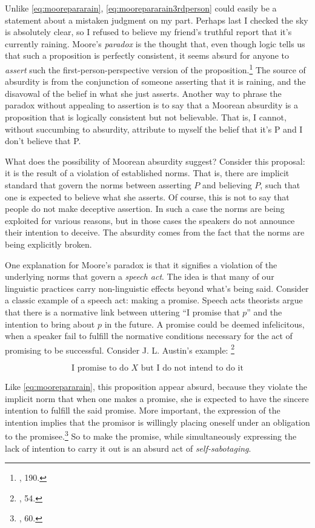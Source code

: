 Unlike \ref{eq:moorepararain}, \ref{eq:moorepararain3rdperson} could easily be a statement about a mistaken judgment on my
part. Perhaps last I checked the sky is absolutely clear, so I refused to believe my friend's truthful report that it's currently raining. Moore's \emph{paradox} is the thought that, even though logic
tells us that such a proposition is perfectly consistent, it seems
absurd for anyone to \emph{assert} such the first-person-perspective
version of the proposition.\footnote{\cite{greenmoore}, 190.} The source of
absurdity is from the conjunction of someone asserting that it is
raining, and the disavowal of the belief in what she just asserts.
Another way to phrase the paradox without appealing to assertion is to
say that a Moorean absurdity is a proposition that is logically
consistent but not believable. That is, I cannot, without succumbing to
absurdity, attribute to myself the belief that it's P and I don't
believe that P.

What does the possibility of Moorean absurdity suggest? Consider this proposal: it is the result of a violation of
established norms. That is, there are implicit standard that govern the
norms between asserting \(P\) and believing \(P\), such that one is
expected to believe what she asserts. Of course, this is not to say that
people do not make deceptive assertion. In such a case the norms are
being exploited for various reasons, but in those cases the speakers do
not announce their intention to deceive. The absurdity comes from the
fact that the norms are being explicitly broken.

One explanation for Moore's paradox is that it signifies a violation of
the underlying norms that govern a \emph{speech act}. The idea is that many of
our linguistic practices carry non-linguistic effects beyond what's being said. Consider a classic example of a speech act: making
a promise. Speech acts theorists argue that there is a normative link
between uttering ``I promise that \(p\)'' and the intention to bring
about \(p\) in the future. A promise could be deemed infelicitous, when
a speaker fail to fulfill the normative conditions necessary for the act
of promising to be successful. Consider J. L. Austin's example: \footnote{\cite{austin}, 54.}

\begin{equation}
	\text{I promise to do \(X\) but I do not intend to do it}
	\label{eq:austinprom}
\end{equation}
 

Like \ref{eq:moorepararain}, this proposition appear
absurd, because they violate the implicit norm that when one makes a
promise, she is expected to have the sincere intention to fulfill the
said promise. More important, the expression of the intention implies that the
promisor is willingly placing oneself under an obligation to the
promisee.\footnote{\cite{searle}, 60.} So to
make the promise, while simultaneously expressing the lack of intention
to carry it out is an absurd act of \emph{self-sabotaging}. 

